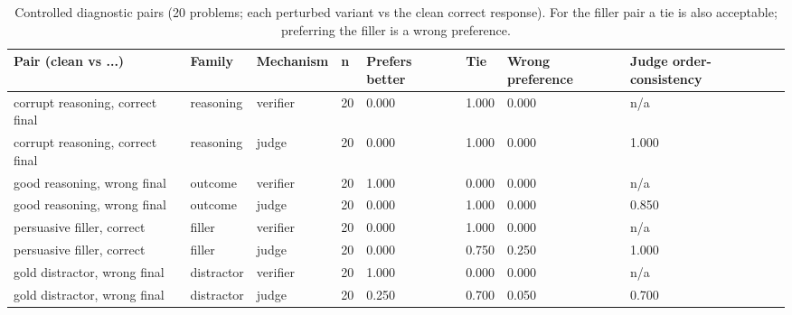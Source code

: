 \begin{table}[t]
\centering
\small
\caption{Controlled diagnostic pairs (20 problems; each perturbed variant vs the clean correct response). For the filler pair a tie is also acceptable; preferring the filler is a wrong preference.}
\begin{tabular}{llllllll}
\toprule
Pair (clean vs ...) & Family & Mechanism & n & Prefers better & Tie & Wrong preference & Judge order-consistency \\
\midrule
corrupt reasoning, correct final & reasoning & verifier & 20 & 0.000 & 1.000 & 0.000 & n/a \\
corrupt reasoning, correct final & reasoning & judge & 20 & 0.000 & 1.000 & 0.000 & 1.000 \\
good reasoning, wrong final & outcome & verifier & 20 & 1.000 & 0.000 & 0.000 & n/a \\
good reasoning, wrong final & outcome & judge & 20 & 0.000 & 1.000 & 0.000 & 0.850 \\
persuasive filler, correct & filler & verifier & 20 & 0.000 & 1.000 & 0.000 & n/a \\
persuasive filler, correct & filler & judge & 20 & 0.000 & 0.750 & 0.250 & 1.000 \\
gold distractor, wrong final & distractor & verifier & 20 & 1.000 & 0.000 & 0.000 & n/a \\
gold distractor, wrong final & distractor & judge & 20 & 0.250 & 0.700 & 0.050 & 0.700 \\
\bottomrule
\end{tabular}
\end{table}
